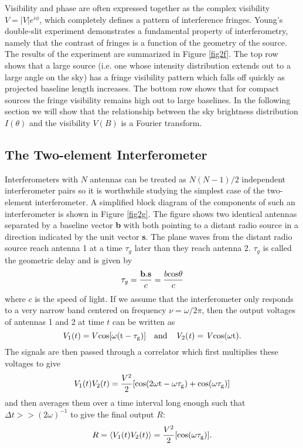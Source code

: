 Visibility and phase are often expressed together as the complex visibility $V=|V|e^{i\phi}$, which completely defines a pattern of interference fringes. Young's double-slit experiment demonstrates a fundamental property of interferometry, namely that the contrast of fringes is a function of the geometry of the source. The results of the experiment are summarized in Figure \ref{fig2f}. The top row shows that a large source (i.e. one whose intensity distribution extends out to a large angle on the sky) has a fringe visibility pattern which falls off quickly as projected baseline length increases. The bottom row shows that for compact sources the fringe visibility remains high out to large baselines. In the following section we will show that the relationship between the sky brightness distribution $I(\theta)$ and the visibility $V(B)$ is a Fourier transform.

\subsection{The Two-element Interferometer}\label{subsec:5}
Interferometers with $N$ antennas can be treated as $N(N-1)/2$ independent interferometer pairs so it is worthwhile studying the simplest case of the two-element interferometer. A simplified block diagram of the components of such an interferometer is shown in Figure \ref{fig2g}. The figure shows two identical antennas separated by a baseline vector \textbf{b} with both pointing to a distant radio source in a direction indicated by the unit vector \textbf{s}. The plane waves from the distant radio source reach antenna 1 at a time $\tau _g$ later than they reach antenna 2. $\tau _g$ is called the geometric delay and is given by
\begin{equation}
\tau _{g}=\frac{\textbf{b}.\textbf{s}}{c}=\frac{b\rm{cos}\theta}{c}
\end{equation}
where $c$ is the speed of light. If we assume that the interferometer only responds to a very narrow band centered on frequency $\nu=\omega /2\pi$, then the output voltages of antennas 1 and 2 at time $t$ can be written as 
\begin{equation}
V_1(t)=V\rm{cos}[\omega(t-\tau _g)] \ \ \ \rm{and} \ \ \ \mathit{V_{\rm{2}}(t)=V\rm{cos}(\omega t)}.
\end{equation}
The signals are then passed through a correlator which first multiplies these voltages to give
\begin{equation}
V_1(t) V_2(t)=\frac{V^2}{2}[\rm{cos(2\omega t -\omega \tau _g)+\rm{cos}(\omega \tau _g)}]
\end{equation}
and then averages them over a time interval long enough such that $\Delta t >> (2\omega)^{-1}$ to give the final output $R$:
\begin{equation}
R=\langle V_1(t)V_2(t)\rangle = \frac{V^2}{2}[\rm{cos}(\omega \tau _g)].
\end{equation}

